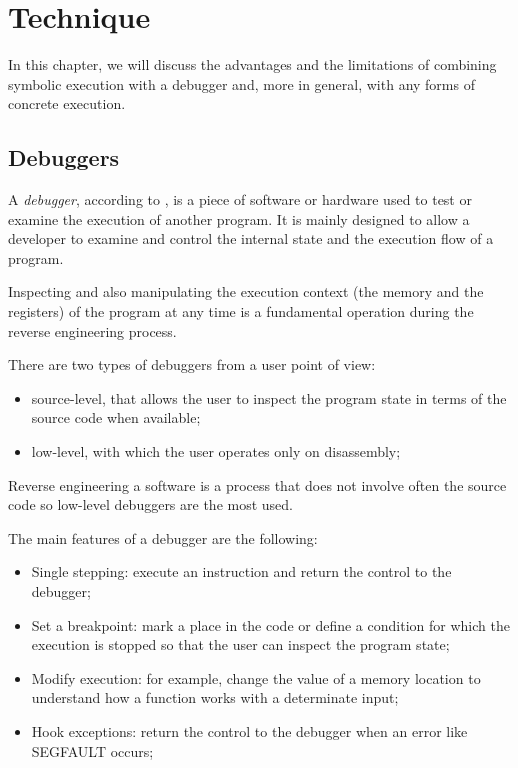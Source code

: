 \chapter{Technique}

In this chapter, we will discuss the advantages and the limitations of combining symbolic execution with a debugger and, more in general, with any forms of concrete execution.

\section{Debuggers}

A {\em debugger}, according to \cite{PMA}, is a piece of software or hardware used to test or examine the execution of another program.
It is mainly designed to allow a developer to examine and control the internal state and the execution flow of a program.

Inspecting and also manipulating the execution context (the memory and the registers) of the program at any time is a fundamental operation during the reverse engineering process.

There are two types of debuggers from a user point of view:
\begin{itemize}
\item source-level, that allows the user to inspect the program state in terms of the source code when available;
\item low-level, with which the user operates only on disassembly;
\end{itemize}

Reverse engineering a software is a process that does not involve often the source code so low-level debuggers are the most used.

The main features of a debugger are the following:

\begin{itemize}
\item Single stepping: execute an instruction and return the control to the debugger;
\item Set a breakpoint: mark a place in the code or define a condition for which the execution is stopped so that the user can inspect the program state;
\item Modify execution: for example, change the value of a memory location to understand how a function works with a determinate input;
\item Hook exceptions: return the control to the debugger when an error like SEGFAULT occurs;
\end{itemize}

